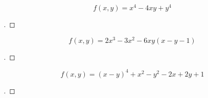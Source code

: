 \documentclass[12pt]{article}
\newenvironment{exercise}[2][Exercise]{\begin{trivlist}
\item[\hskip \labelsep {\bfseries #1}\hskip \labelsep {\bfseries #2.}]}{\end{trivlist}}
\begin{document}
\pagebreak
\begin{exercise}{2}
	\[ f(x,y) = x^4 - 4xy + y^4 \]
\end{exercise}
\begin{proof}[]
\end{proof}

\pagebreak
\begin{exercise}{3}
\[ f(x,y) = 2x^3 - 3x^2 - 6xy(x - y - 1) \]
\end{exercise}
\begin{proof}[]
\end{proof}

\pagebreak
\begin{exercise}{4}
\[ f(x,y) = (x - y)^4 + x^2 - y^2 - 2x + 2y + 1 \]
\end{exercise}
\begin{proof}[]
\end{proof}
\end{document}
